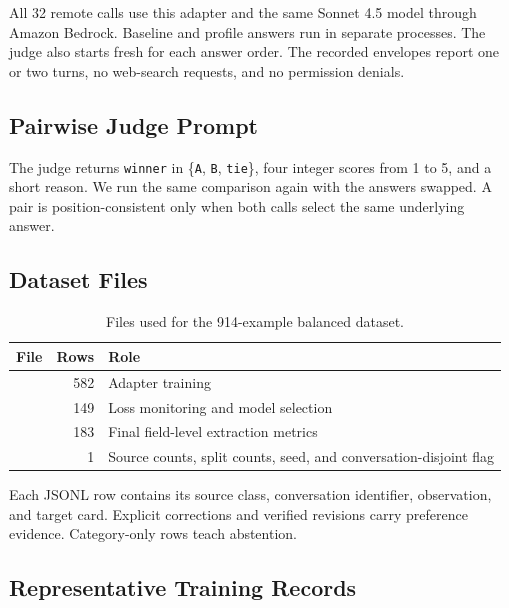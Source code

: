 All 32 remote calls use this adapter and the same Sonnet 4.5 model through
Amazon Bedrock. Baseline and profile answers run in separate processes. The
judge also starts fresh for each answer order. The recorded envelopes report
one or two turns, no web-search requests, and no permission denials.

\subsection{Pairwise Judge Prompt}

\begin{PromptBox}

\end{PromptBox}

The judge returns \texttt{winner} in
\{\texttt{A}, \texttt{B}, \texttt{tie}\}, four integer scores from 1 to 5, and
a short reason. We run the same comparison again with the answers swapped. A
pair is position-consistent only when both calls select the same underlying
answer.

\subsection{Dataset Files}

\begin{table}[H]
\centering
\small
\caption{Files used for the 914-example balanced dataset.}
\label{tab:dataset-files}
\begin{tabularx}{\linewidth}{>{\bfseries}p{2.65cm}rY}
\toprule
{}
File & Rows & Role \\
\midrule
{} & 582 & Adapter training \\
 & 149 & Loss monitoring and model selection \\
 & 183 & Final field-level extraction metrics \\
 & 1 & Source counts, split counts, seed, and
conversation-disjoint flag \\
\bottomrule
\end{tabularx}
\end{table}

Each JSONL row contains its source class, conversation identifier, observation,
and target card. Explicit corrections and verified revisions carry preference
evidence. Category-only rows teach abstention.

\subsection{Representative Training Records}

